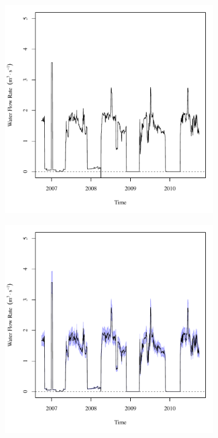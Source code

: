 \begin{linenumbers}
\begin{landscape}
\begin{figure}
\begin{subfigure}{0.7\textwidth}
			\includegraphics[width=\tableCustomSize]{"Figures/Results_DSR/Deterministic/Q BUF"}
		\end{subfigure}%
		\begin{subfigure}{0.7\textwidth}
			\centering
			\includegraphics[width=\tableCustomSize]{"Figures/Results_DSR/Stochastic/Q BUF"}

\end{subfigure}
\end{figure}
\end{landscape}
\end{linenumbers}
